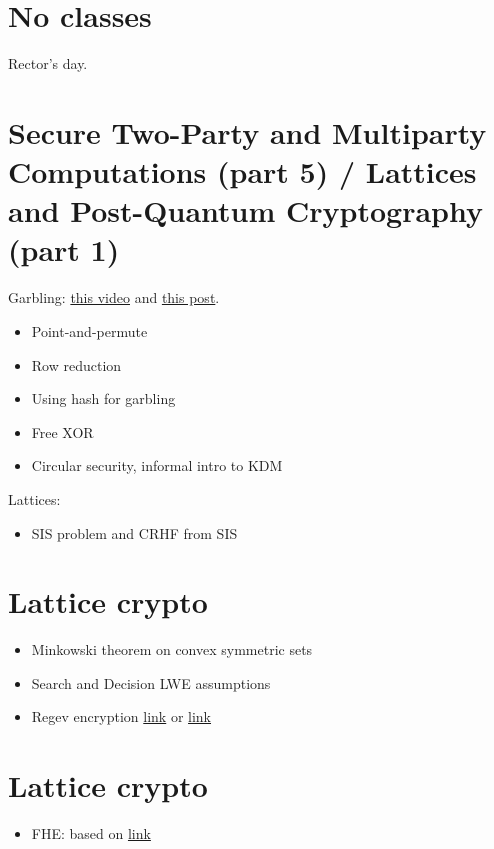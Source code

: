 \documentclass{llncs}
\begin{document}
\section{No classes}
Rector's day.

\section{Secure Two-Party and Multiparty Computations (part 5) / Lattices and Post-Quantum Cryptography (part 1)}
Garbling: \href{https://www.youtube.com/watch?v=FTxh908u9y8}{this video} and \href{https://blog.cryptographyengineering.com/2012/04/27/wonk-post-circular-security/}{this post}.
\begin{itemize}
	\item Point-and-permute
	\item Row reduction
	\item Using hash for garbling
	\item Free XOR
	\item Circular security, informal intro to KDM
\end{itemize}

Lattices:
\begin{itemize}
	\item SIS problem and CRHF from SIS
\end{itemize}

\section{Lattice crypto}
\begin{itemize}
	\item Minkowski theorem on convex symmetric sets
	\item Search and Decision LWE assumptions
	\item Regev encryption \href{https://www.youtube.com/watch?v=C_8_xsAwiyw}{link} or \href{https://perso.ens-lyon.fr/alain.passelegue/m2notes/class6.pdf}{link}
\end{itemize}

\section{Lattice crypto}
\begin{itemize}
	\item FHE: based on \href{https://www.youtube.com/watch?v=TySXpV86958}{link}
\end{itemize}


\printbibliography %
\end{document}
